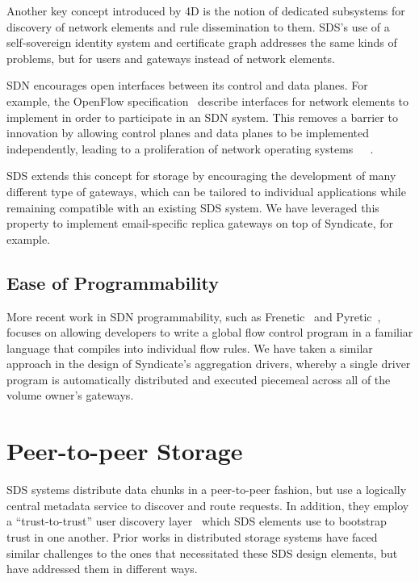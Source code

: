 Another key concept introduced by 4D is the notion of
dedicated subsystems for discovery of network elements and rule dissemination to
them.  SDS's use of a self-sovereign identity system and certificate graph
addresses the same kinds of problems, but for users and gateways instead of network
elements.

SDN encourages open interfaces between its control and data planes.
For example, the OpenFlow specification~\cite{openflow} describe interfaces for
network elements to implement in order to participate in an SDN system.
This removes a barrier to innovation by allowing control planes and data planes
to be implemented independently, leading to a proliferation of network operating
systems~\cite{onos}~\cite{NodeOS}~\cite{NOX}.

SDS extends this concept for
storage by encouraging the development of many different type of gateways, which
can be tailored to individual applications while remaining compatible with an
existing SDS system.  We have leveraged this property to implement email-specific replica
gateways on top of Syndicate, for example.

\subsection{Ease of Programmability}

More recent work in SDN programmability, such as Frenetic~\cite{frenetic} and
Pyretic~\cite{pyretic}, focuses on allowing developers to write a global flow
control program in a familiar language that compiles into individual flow rules.
We have taken a similar approach in the design of Syndicate's aggregation
drivers, whereby a single driver program is automatically distributed and
executed piecemeal across all of the volume owner's gateways.

\section{Peer-to-peer Storage}

SDS systems distribute data chunks in a peer-to-peer fashion, but use
a logically central metadata service to discover and route requests.  In
addition, they employ a ``trust-to-trust'' user discovery
layer~\cite{trust-to-trust-principle} which SDS elements use to bootstrap trust
in one another.  Prior works in distributed storage systems have faced similar
challenges to the ones that necessitated these SDS design elements, but have
addressed them in different ways.

